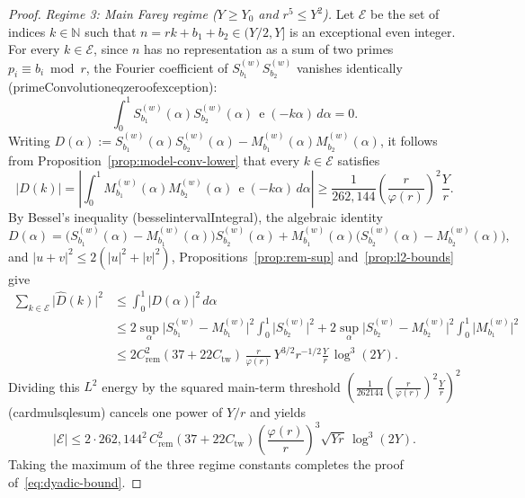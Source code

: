 \documentclass[11pt,reqno]{amsart}
\numberwithin{equation}{section}
\theoremstyle{definition}
\newcommand{\N}{\mathbb{N}}
\newcommand{\1}{\mathbf{1}}
\newcommand{\e}{\operatorname{e}}
\newcommand{\lean}[1]{{\footnotesize\ttfamily\renewcommand{\_}{\textunderscore\allowbreak}#1}}
\begin{document}
\begin{proof}
\emph{Regime 3: Main Farey regime ($Y \ge Y_0$ and $r^5 \le Y^2$).}
Let $\mathcal{E}$ be the set of indices $k \in \N$ such that $n = r k + b_1 + b_2 \in (Y/2, Y]$ is an exceptional even integer. For every $k \in \mathcal{E}$, since $n$ has no representation as a sum of two primes $p_i \equiv b_i \bmod r$, the Fourier coefficient of $S_{b_1}^{(w)} S_{b_2}^{(w)}$ vanishes identically (\lean{primeConvolution\_eq\_zero\_of\_exception}):
\[
  \int_0^1 S_{b_1}^{(w)}(\alpha) S_{b_2}^{(w)}(\alpha)\, \e(-k\alpha)\,d\alpha = 0.
\]
Writing $D(\alpha) := S_{b_1}^{(w)}(\alpha) S_{b_2}^{(w)}(\alpha) - M_{b_1}^{(w)}(\alpha) M_{b_2}^{(w)}(\alpha)$, it follows from Proposition~\ref{prop:model-conv-lower} that every $k \in \mathcal{E}$ satisfies
\[
  \bigl|\widehat{D}(k)\bigr|
  = \left|\int_0^1 M_{b_1}^{(w)}(\alpha) M_{b_2}^{(w)}(\alpha)\, \e(-k\alpha)\,d\alpha\right|
  \ge \frac{1}{262{,}144}\left(\frac{r}{\varphi(r)}\right)^2 \frac{Y}{r}.
\]
By Bessel's inequality (\lean{bessel\_intervalIntegral}), the algebraic identity
\[
  D(\alpha) = \bigl(S_{b_1}^{(w)}(\alpha) - M_{b_1}^{(w)}(\alpha)\bigr) S_{b_2}^{(w)}(\alpha)
              + M_{b_1}^{(w)}(\alpha) \bigl(S_{b_2}^{(w)}(\alpha) - M_{b_2}^{(w)}(\alpha)\bigr),
\]
and $|u + v|^2 \le 2(|u|^2 + |v|^2)$, Propositions~\ref{prop:rem-sup} and~\ref{prop:l2-bounds} give
\begin{align*}
  \sum_{k \in \mathcal{E}} \bigl|\widehat{D}(k)\bigr|^2
  &\le \int_0^1 |D(\alpha)|^2\,d\alpha \\
  &\le 2 \sup_{\alpha} \bigl|S_{b_1}^{(w)} - M_{b_1}^{(w)}\bigr|^2 \int_0^1 \bigl|S_{b_2}^{(w)}\bigr|^2
       + 2 \sup_{\alpha} \bigl|S_{b_2}^{(w)} - M_{b_2}^{(w)}\bigr|^2 \int_0^1 \bigl|M_{b_1}^{(w)}\bigr|^2 \\
  &\le 2 C_{\mathrm{rem}}^2 (37 + 22 C_{\mathrm{tw}})\, \frac{r}{\varphi(r)}\, Y^{3/2} r^{-1/2} \frac{Y}{r}\, \log^3(2Y).
\end{align*}
Dividing this $L^2$ energy by the squared main-term threshold $\left(\frac{1}{262144}\left(\frac{r}{\varphi(r)}\right)^2\frac{Y}{r}\right)^2$ (\lean{card\_mul\_sq\_le\_sum}) cancels one power of $Y/r$ and yields
\[
  |\mathcal{E}|
  \le 2 \cdot 262{,}144^2\, C_{\mathrm{rem}}^2 (37 + 22 C_{\mathrm{tw}})
      \left(\frac{\varphi(r)}{r}\right)^3 \sqrt{Y r}\,\log^3(2Y).
\]
Taking the maximum of the three regime constants completes the proof of~\eqref{eq:dyadic-bound}.
\end{proof}
\end{document}

